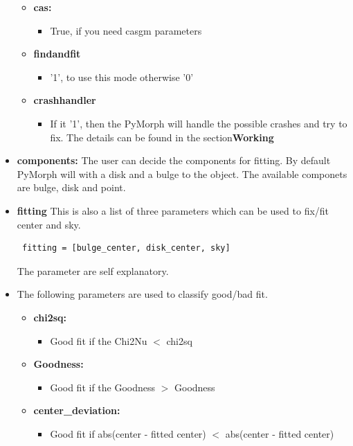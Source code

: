 \documentclass[a4paper,12pt]{article}
\begin{document}
\begin{itemize}
\begin{itemize}
\item[] \textbf{cas:}
\begin{itemize}
\item True, if you need casgm parameters
\end{itemize}

\item[] \textbf{findandfit}
\begin{itemize}
\item '1', to use this mode otherwise '0'
\end{itemize}

\item[] \textbf{crashhandler}
\begin{itemize}
\item If it '1', then the PyMorph will handle the possible crashes and try to fix. The details can be found in the section\textbf{Working}
\end{itemize}

\end{itemize}

\item \textbf{components:} The user can decide the components for fitting. By default PyMorph will with a disk and a bulge to the object. The available componets are bulge, disk and point.
\item \textbf{fitting} This is also a list of three parameters which can be used to fix/fit center and sky.
\begin{verbatim} fitting = [bulge_center, disk_center, sky]
\end{verbatim}
The parameter are self explanatory.
\item The following parameters are used to classify good/bad fit.
\begin{itemize}
\item[] \textbf{chi2sq:}
\begin{itemize}
\item Good fit if the Chi2Nu $<$ chi2sq
\end{itemize}

\item[] \textbf{Goodness:}
\begin{itemize}
\item Good fit if the Goodness $>$ Goodness
\end{itemize}

\item[] \textbf{center\_deviation:}
\begin{itemize}
\item Good fit if abs(center - fitted center) $<$ abs(center - fitted center)
\end{itemize}

\end{itemize}

\end{itemize}
\end{document}
